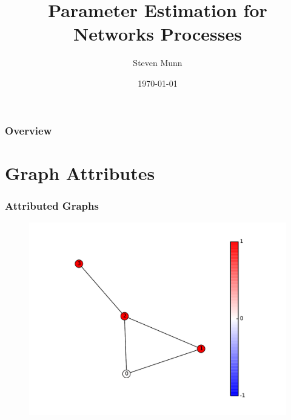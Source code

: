 \documentclass{beamer}
\title[Network Process Modeling]{Parameter Estimation for Networks Processes}
\author{Steven Munn} %
\institute[UCSB]
{
University of California, Santa Barbara \\ %
\medskip
\textit{sjmunn@umail.ucsb.edu} %
}
\date{\today} %
\begin{document}
\begin{frame}
\titlepage %
\end{frame}

\begin{frame}
\frametitle{Overview} %
\tableofcontents %
\end{frame}


\section{Graph Attributes}

\begin{frame}
\frametitle{Attributed Graphs}
\begin{figure}
\includegraphics[width=0.8\linewidth]{figs/attributed_graph}
\end{figure}
\end{frame}
\end{document}
